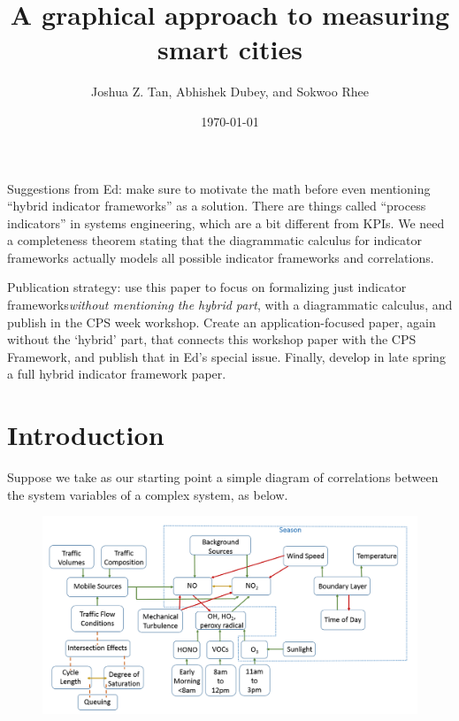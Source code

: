 \documentclass{sig-alternate-05-2015}
\title{A graphical approach to measuring smart cities}
\author{Joshua Z. Tan, Abhishek Dubey, and Sokwoo Rhee}
\date{\today}
\theoremstyle{plain}
\theoremstyle{plain}
\theoremstyle{remark}
\newcommand{\redout}[1]{{\color{red}#1}}
\begin{document}
\maketitle



\redout{Suggestions from Ed: make sure to motivate the math before even mentioning ``hybrid indicator frameworks'' as a solution. There are things called ``process indicators'' in systems engineering, which are a bit different from KPIs. We need a completeness theorem stating that the diagrammatic calculus for indicator frameworks actually models all possible indicator frameworks and correlations.}

\redout{Publication strategy: use this paper to focus on formalizing just indicator frameworks\emph{without mentioning the hybrid part}, with a diagrammatic calculus, and publish in the CPS week workshop. Create an application-focused paper, again without the `hybrid' part, that connects this workshop paper with the CPS Framework, and publish that in Ed's special issue. Finally, develop in late spring a full hybrid indicator framework paper.}


\section{Introduction}
Suppose we take as our starting point a simple diagram of correlations between the system variables of a complex system, as below.

\begin{figure}[h!]
\includegraphics[width=\linewidth]{portland}
\end{figure}
\end{document}
